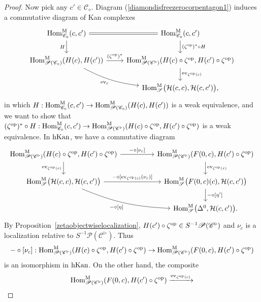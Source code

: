 \documentclass{tac}
\newcommand{\s}[1]{\mathscr{#1}}
\renewcommand{\c}[1]{\mathcal{#1}}
\newcommand{\tx}[1]{\textnormal{#1}}
\begin{document}
\begin{proof}
Now pick any $c' \in \s{C}_\diamond$.  Diagram (\ref{diamondisfreezerocorpentagon1}) induces a commutative diagram of Kan complexes
\[\begin{tikzcd}
\tx{Hom}^\tx{M}_{\s{C}_\diamond } (c,c') \arrow[equal]{r} \arrow[]{d}[swap]{H} & \tx{Hom}^\tx{M}_{\s{C}_\diamond } (c,c') \arrow[]{d}{(\zeta^\tx{op})^* \circ H} \\
\tx{Hom}^\tx{M}_{\s{P}(\s{C}_\diamond )} (H(c),H(c')) \arrow[]{r}{(\zeta^\tx{op} )^*}  \arrow[bend right=10]{dr}[swap]{\tx{ev}_{c} } & \tx{Hom}^\tx{M}_{\s{P}(\s{C}^\triangleright )} (H(c)\circ \zeta^\tx{op} ,H(c')\circ \zeta^\tx{op} )  \arrow[]{d}{\tx{ev}_{\zeta^\tx{op} (c)} } \\
& \tx{Hom}^\tx{M}_{\s{S}} \big( \c{H}(c,c) , \c{H}(c,c') \big),
\end{tikzcd}\]
in which $H : \tx{Hom}^\tx{M}_{\s{C}_\diamond } (c,c') \to \tx{Hom}^\tx{M}_{\s{P}(\s{C}_\diamond )} (H(c),H(c'))$ is a weak equivalence, and we want to show that $(\zeta^\tx{op})^* \circ H :  \tx{Hom}^\tx{M}_{\s{C}_\diamond } (c,c') \to \tx{Hom}^\tx{M}_{\s{P}(\s{C}^\triangleright )} (H(c)\circ \zeta^\tx{op} ,H(c')\circ \zeta^\tx{op} ) $ is a weak equivalence.  In $\tx{hKan}$, we have a commutative diagram
\[\begin{tikzcd}
 \tx{Hom}^\tx{M}_{\s{P}(\s{C}^\triangleright )} (H(c)\circ \zeta^\tx{op} ,H(c')\circ \zeta^\tx{op} )  \arrow[]{d}[swap]{\tx{ev}_{\zeta^\tx{op} (c)} } \arrow[]{rr}{-\circ [\nu_c ]} & & \tx{Hom}^\tx{M}_{\s{P}(\s{C}^\triangleright )} (F(0,c) ,H(c')\circ \zeta^\tx{op} )  \arrow[]{d}{\tx{ev}_{\zeta^\tx{op} (c)} } \\
\tx{Hom}^\tx{M}_{\s{S}} \big( \c{H}(c,c) , \c{H}(c,c') \big) \arrow[bend right=10]{drr}[swap]{-\circ [\eta]} \arrow[]{rr}{-\circ [\tx{ev}_{\zeta^\tx{op} (c)} (\nu_c )]} & & \tx{Hom}^\tx{M}_{\s{S}} \big( F(0,c)(c) , \c{H}(c,c') \big) \arrow[]{d}{-\circ [\eta' ]} \\
& & \tx{Hom}^\tx{M}_{\s{S}} \big( \Delta^0 , \c{H}(c,c') \big).
\end{tikzcd}\]
By Proposition~\ref{zetaobjectwiselocalization}, $H(c')\circ \zeta^\tx{op} \in S^{-1} \s{P}(\s{C}^\triangleright )$ and $\nu_c$ is a localization relative to $S^{-1} \s{P}(\s{C}^\triangleright )$.  Thus
\[ -\circ [\nu_c ] : \tx{Hom}^\tx{M}_{\s{P}(\s{C}^\triangleright )} (H(c)\circ \zeta^\tx{op} ,H(c')\circ \zeta^\tx{op} )  \to \tx{Hom}^\tx{M}_{\s{P}(\s{C}^\triangleright )} (F(0,c) ,H(c')\circ \zeta^\tx{op} )  \]
is an isomorphism in $\tx{hKan}$.  On the other hand, the composite 
\[ \tx{Hom}^\tx{M}_{\s{P}(\s{C}^\triangleright )} (F(0,c) ,H(c')\circ \zeta^\tx{op} ) \xrightarrow{\tx{ev}_{\zeta^\tx{op} (c)}} 
\]
\end{proof}
\end{document}
